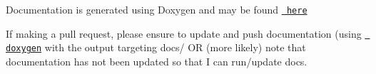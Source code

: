 Documentation is generated using Doxygen and may be found \href{https://hernantech.github.io/HR23_VCU_Firmware/html/index.html}{\texttt{ here}}

If making a pull request, please ensure to update and push documentation (using \href{https://www.doxygen.nl/download.html}{\texttt{ doxygen}} with the output targeting \textquotesingle{}docs/\textquotesingle{} OR (more likely) note that documentation has not been updated so that I can run/update docs. 
